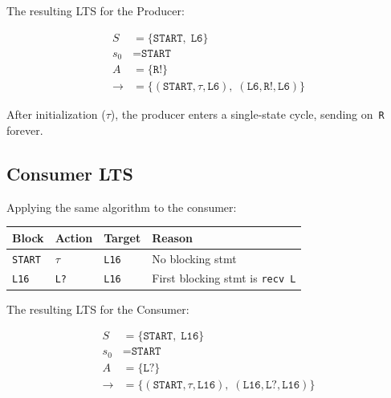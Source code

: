 \documentclass[11pt]{article}
\begin{document}
The resulting LTS for the Producer:

\begin{align*}
S   &= \{\texttt{START},\; \texttt{L6}\} \\
s_0 &= \texttt{START} \\
A   &= \{\texttt{R!}\} \\
{\to} &= \{(\texttt{START}, \tau, \texttt{L6}),\;
           (\texttt{L6}, \texttt{R!}, \texttt{L6})\}
\end{align*}

\begin{center}
\end{center}

After initialization ($\tau$), the producer enters a single-state
cycle, sending on~\texttt{R} forever.

\subsection{Consumer LTS}

Applying the same algorithm to the consumer:

\begin{center}
\begin{tabular}{llll}
\toprule
\textbf{Block} & \textbf{Action} & \textbf{Target} & \textbf{Reason} \\
\midrule
\texttt{START} & $\tau$           & \texttt{L16}    & No blocking stmt \\
\texttt{L16}   & \texttt{L?}      & \texttt{L16}    & First blocking stmt is \texttt{recv L} \\
\bottomrule
\end{tabular}
\end{center}

The resulting LTS for the Consumer:

\begin{align*}
S   &= \{\texttt{START},\; \texttt{L16}\} \\
s_0 &= \texttt{START} \\
A   &= \{\texttt{L?}\} \\
{\to} &= \{(\texttt{START}, \tau, \texttt{L16}),\;
           (\texttt{L16}, \texttt{L?}, \texttt{L16})\}
\end{align*}
\end{document}

